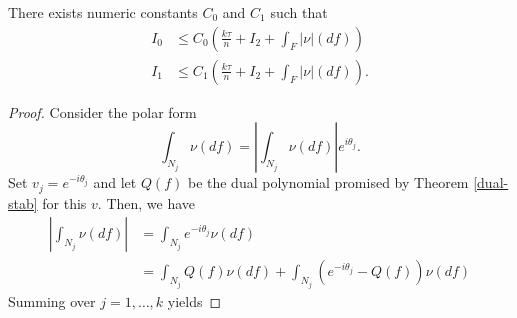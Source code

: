 \begin{lemma}
\label{part2}
There exists numeric constants $C_0$ and $C_1$ such that
\begin{align*}
I_0 &\leq C_0 \left(\frac{k \tau}{n} + I_2 + \int_F{|\nu|(df)}\right) \\
I_1 &\leq C_1 \left(\frac{k \tau}{n} + I_2 + \int_F{|\nu|(df)}\right).
\end{align*}
\end{lemma}
\begin{proof}
\label{apx:pf:I0I1}
Consider the polar form
\[
  \int_{N_j} \nu ( df)  =  \left| \int_{N_j} \nu ( df) \right| e^{i \theta_j} .
\]
Set $v_j = e^{-i \theta_j}$ and let $Q(f)$ be the dual polynomial promised by Theorem \ref{dual-stab} for this $v$. Then, we have 
\begin{align*}
  \left| \int_{N_j} \nu ( d f) \right| & = 
  \int_{N_j} e^{- i \theta_j} \nu ( d f)\\
  & =  \int_{N_j} Q ( f) \nu ( d f) + 
  \int_{N_j} (e^{- i \theta_j} -  Q ( f) ) \nu ( d f)
\end{align*}
Summing over $j=1,\ldots,k$ yields


\end{proof}
